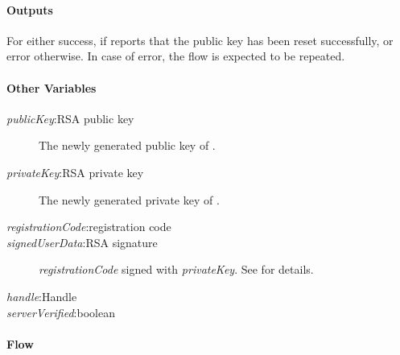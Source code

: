 \documentclass[a4paper,10pt,draft]{article}
\newcommand{\signedUserData}{\emph{signedUserData}}
\newcommand{\serverVerified}{\emph{serverVerified}}
\newcommand{\handle}{\emph{handle}}
\newcommand{\registrationCode}{\emph{registrationCode}}
\newcommand{\privateKey}{\emph{privateKey}}
\newcommand{\publicKey}{\emph{publicKey}}
\begin{document}
\paragraph{Outputs}
For \Client{} either success, if \Server{} reports that the public key has 
been reset successfully, or error otherwise. In case of error, the flow is 
expected to be repeated.

\paragraph{Other Variables}
\SpecialItem
\begin{description}
 \item[\publicKey{}:RSA public key] The newly generated public key of 
\Client{}. 
 \item[\privateKey{}:RSA private key] The newly generated private key of 
\Client{}.
 \item[\registrationCode{}:registration code]
 \item[\signedUserData{}:RSA signature] \registrationCode{} signed with
\privateKey{}. See \cite{crypto_spec} for details.
 \item[\handle{}:Handle]
 \item[\serverVerified:boolean]
\end{description}

\paragraph{Flow}
\end{document}
